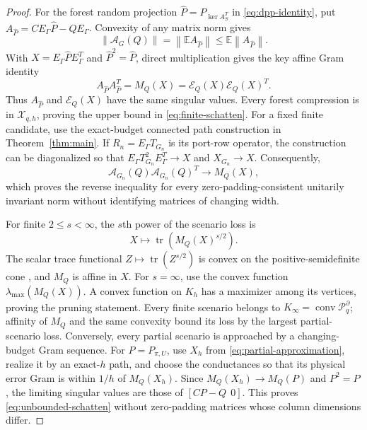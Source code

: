 \documentclass[journal,10pt]{IEEEtran}
\theoremstyle{definition}
\theoremstyle{remark}
\newcommand{\conv}{\operatorname{conv}}
\newcommand{\tr}{\operatorname{tr}}
\newcommand{\cX}{\mathcal X}
\newcommand{\cP}{\mathcal P}
\newcommand{\cE}{\mathcal E}
\newcommand{\cA}{\mathcal A}
\newcommand{\norm}[1]{\left\lVert #1\right\rVert}
\begin{document}
\begin{proof}
For the forest random projection $\widehat P=P_{\ker A_S^T}$ in
\eqref{eq:dpp-identity}, put
$A_{\widehat P}=CE_\Gamma\widehat P-QE_\Gamma$.  Convexity of any matrix norm
gives
\[
  \norm{\cA_G(Q)}
  =\norm{\mathbb E A_{\widehat P}}
  \leq\mathbb E\norm{A_{\widehat P}}.
\]
With $X=E_\Gamma\widehat PE_\Gamma^T$ and $\widehat P^2=\widehat P$, direct
multiplication gives the key affine Gram identity
\begin{equation}
 A_{\widehat P}A_{\widehat P}^T
 =M_Q(X)=\cE_Q(X)\cE_Q(X)^T.
  \label{eq:gram-identity}
\end{equation}
Thus $A_{\widehat P}$ and $\cE_Q(X)$ have the same singular values.  Every
forest compression is in $\cX_{q,h}$, proving the upper bound in
\eqref{eq:finite-schatten}.  For a fixed finite candidate, use the exact-budget
connected path construction in Theorem~\ref{thm:main}.  If
$R_n=E_\Gamma T_{G_n}$ is its port-row operator, the construction can be
diagonalized so that $E_\Gamma T_{G_n}^2E_\Gamma^T\to X$ and
$X_{G_n}\to X$.  Consequently,
\begin{equation}
 \cA_{G_n}(Q)\cA_{G_n}(Q)^T\longrightarrow M_Q(X),
 \label{eq:physical-gram-limit}
\end{equation}
which proves the reverse inequality for every zero-padding-consistent
unitarily invariant norm without identifying matrices of changing width.

For finite $2\leq s<\infty$, the $s$th power of the scenario loss is
\[
  X\longmapsto\tr\left(M_Q(X)^{s/2}\right).
\]
The scalar trace functional $Z\mapsto\tr(Z^{s/2})$ is convex on the
positive-semidefinite cone \cite{bhatia1997}, and $M_Q$ is affine in $X$.
For $s=\infty$, use the convex function
$\lambda_{\max}(M_Q(X))$.  A convex function on $K_h$ has a maximizer among
its vertices, proving the pruning statement.  Every finite scenario belongs
to $K_\infty=\conv\cP_q^\partial$; affinity of $M_Q$ and the same convexity
bound its loss by the largest partial-scenario loss.  Conversely, every
partial scenario is approached by a changing-budget Gram sequence.  For
$P=P_{\pi,U}$, use $X_h$ from \eqref{eq:partial-approximation}, realize it by
an exact-$h$ path, and choose the conductances so that its physical error Gram
is within $1/h$ of $M_Q(X_h)$.  Since $M_Q(X_h)\to M_Q(P)$ and $P^2=P$, the
limiting singular values are those of $[CP-Q\ \ 0]$.  This proves
\eqref{eq:unbounded-schatten} without zero-padding matrices whose column
dimensions differ.


\end{proof}
\end{document}
